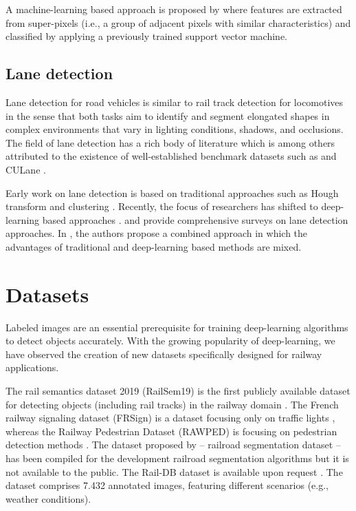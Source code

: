 \documentclass[Master,MDS,english]{BASE/twbook} %
\begin{document}
A machine-learning based approach is proposed by \citep{teng2016visual} where features are extracted from super-pixels (i.e., a group of adjacent pixels with similar characteristics) and classified by applying a previously trained support vector machine.


\section{Lane detection}

Lane detection for road vehicles is similar to rail track detection for locomotives in the sense that both tasks aim to identify and segment elongated shapes in complex environments that vary in lighting conditions, shadows, and occlusions. 
The field of lane detection has a rich body of literature which is among others attributed to the existence of well-established benchmark datasets such as \cite{TuSimple} and CULane \citep{pan2018SCNN}. 

Early work on lane detection is based on traditional approaches such as Hough transform and clustering \citep{10.1145/361237.361242, 5432669}. Recently, the focus of researchers has shifted to deep-learning based approaches \citep{meyer2021yolino, zheng2022clrnet, wang2022keypoint}.
\cite{tang2021review} and \cite{yang2023lane} provide comprehensive surveys on lane detection approaches. In \citep{yang2023lane}, the authors propose a combined approach in which the advantages of traditional and deep-learning based methods are mixed.


\chapter{Datasets} %

Labeled images are an essential prerequisite for training deep-learning algorithms to detect objects accurately.
With the growing popularity of deep-learning, we have observed the creation of new datasets specifically designed for railway applications.

The rail semantics dataset 2019 (RailSem19) is the first publicly available
dataset for detecting objects (including rail tracks) in the railway domain \citep{9025646}. 
The French railway signaling dataset (FRSign) is a dataset focusing only on traffic lights \citep{9025646}, whereas the Railway Pedestrian Dataset (RAWPED) is focusing on pedestrian detection methods \citep{9050835}. The dataset proposed by \cite{8859360} -- railroad segmentation dataset -- has been compiled for the development railroad segmentation algorithms but it is not available to the public. The Rail-DB dataset is available upon request \citep{10.1145/3503161.3548050}. The dataset comprises 7.432 annotated images, featuring different scenarios (e.g., weather conditions). 
\end{document}
